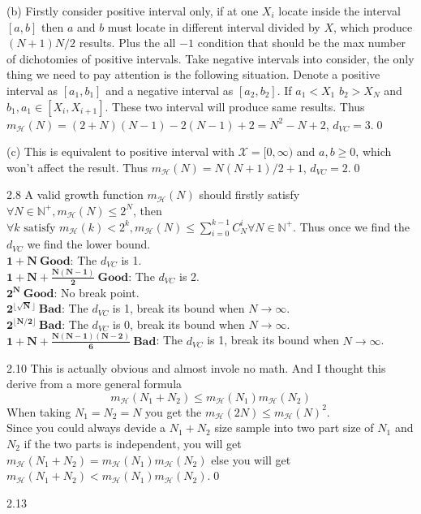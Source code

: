 \documentclass{article}
\def\mH{m_\mathcal{H}}
\begin{document}
\begin{tlist}{5}
\begin{tlist}{4}
		\item[(b)]
		Firstly consider positive interval only, if at one $X_i$ locate inside the interval $[a,b]$ then $a$ and $b$ must locate in different interval divided by $X$, which produce $(N+1)N/2$ results. Plus the all $-1$ condition that should be the max number of dichotomies of positive intervals. Take negative intervals into consider, the only thing we need to pay attention is the following situation. Denote a positive interval as $[a_1,b_1]$ and a negative interval as $[a_2,b_2]$. If $a_1 < X_1$ $b_2 > X_N$ and $b_1,a_1\in [X_i,X_{i+1}]$. These two interval will produce same results. Thus $m_{\mathcal{H}}(N)=(2+N)(N-1)-2(N-1)+2=N^2-N+2$, $d_{VC}=3$.\qed
		\item[(c)]
		This is equivalent to positive interval with $\mathcal{X}=[0,\infty)$ and $a,b\geq 0$, which won't affect the result. Thus $\mH(N)=N(N+1)/2+1$, $d_{VC}=2$.\qed
	\end{tlist}
	\item[2.8]
	A valid growth function $\mH(N)$ should firstly satisfy $\forall N\in\mathbb{N^+}, \mH(N)\leq 2^N$, then $\forall k \text{ satisfy } \mH(k)<2^k, \mH(N)\leq\sum_{i=0}^{k-1}C^i_N\forall N\in\mathbb{N^+}$. Thus once we find the $d_{VC}$ we find the lower bound.\\
	$\mathbf{1+N\ \text{Good}}$: The $d_{VC}$ is 1.\\
	$\mathbf{1+N+\frac{N(N-1)}{2}\ \text{Good}}$: The $d_{VC}$ is 2.\\
	$\mathbf{2^N\ \text{Good}}$: No break point.\\
	$\mathbf{2^{\lfloor\sqrt{N}\rfloor}\ \text{Bad}}$: The $d_{VC}$ is 1, break its bound when $N\to\infty$.\\
	$\mathbf{2^{\lfloor N/2\rfloor}\ \text{Bad}}$: The $d_{VC}$ is 0, break its bound when $N\to\infty$.\\
	$\mathbf{1+N+\frac{N(N-1)(N-2)}{6}\ \text{Bad}}$: The $d_{VC}$ is 1, break its bound when $N\to\infty$.
	\item[2.10]
	This is actually obvious and almost invole no math. And I thought this derive from a more general formula $$\mH(N_1+N_2)\leq \mH(N_1)\mH(N_2)$$ When taking $N_1=N_2=N$ you get the $\mH(2N)\leq \mH(N)^2$.\\
	Since you could always devide a $N_1+N_2$ size sample into two part size of $N_1$ and $N_2$ if the two parts is independent, you will get $\mH(N_1+N_2)= \mH(N_1)\mH(N_2)$ else you will get $\mH(N_1+N_2)<\mH(N_1)\mH(N_2)$.\qed
	\item[2.13]
	\begin{tlist}{4}

\end{tlist}
\end{tlist}
\end{document}
